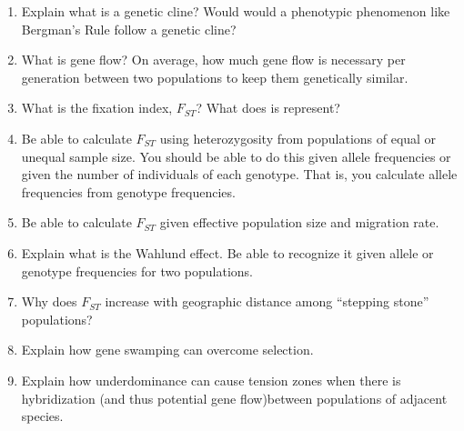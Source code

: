 \documentclass[letterpaper]{tufte-handout}
\begin{document}
\begin{enumerate}
	
	\item Explain what is a genetic cline? Would would a phenotypic phenomenon like Bergman's Rule follow a genetic cline?
	
	\item What is gene flow? On average, how much gene flow is necessary per generation between two populations to keep them genetically similar.
	
	\item What is the fixation index, $F_{ST}$? What does is represent?

	\item Be able to calculate $F_{ST}$ using heterozygosity from populations of equal or unequal sample size. You should be able to do this given allele frequencies or given the number of individuals of each genotype. That is, you calculate allele frequencies from genotype frequencies.
	
	\item Be able to calculate $F_{ST}$ given effective population size and migration rate. 
	
	\item Explain what is the Wahlund effect. Be able to recognize it given allele or genotype frequencies for two populations.
	
	\item Why does $F_{ST}$ increase with geographic distance among “stepping stone” populations? 
	
	\item Explain how gene swamping can overcome selection.
	
	\item Explain how underdominance can cause tension zones when there is hybridization (and thus potential gene flow)between populations of adjacent species.



\end{enumerate}
\end{document}
